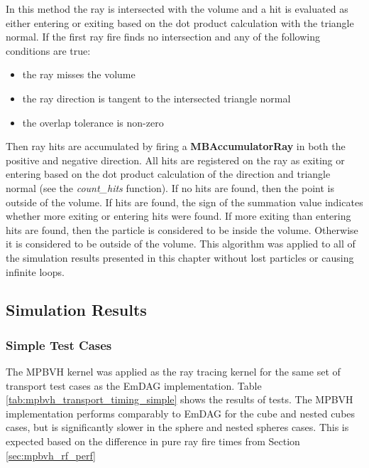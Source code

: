 In this method the ray is intersected with the volume and a hit is evaluated as
either entering or exiting based on the dot product calculation with the
triangle normal. If the first ray fire finds no intersection and any of the
following conditions are true:

\begin{itemize}
  \item the ray misses the volume
  \item the ray direction is tangent to the intersected triangle normal
  \item the overlap tolerance is non-zero
\end{itemize}

Then ray hits are accumulated by firing a \textbf{MBAccumulatorRay} in both the
positive and negative direction. All hits are registered on the ray as exiting
or entering based on the dot product calculation of the direction and triangle
normal (see the \textit{count\_hits} function). If no hits are found, then the
point is outside of the volume. If hits are found, the sign of the summation
value indicates whether more exiting or entering hits were found. If more
exiting than entering hits are found, then the particle is considered to be
inside the volume. Otherwise it is considered to be outside of the volume. This
algorithm was applied to all of the simulation results presented in this chapter
without lost particles or causing infinite loops.

\subsection{Simulation Results}

\subsubsection{Simple Test Cases}\label{subsec:mpbvh_simple_tests}
The MPBVH kernel was applied as the ray tracing kernel for the same set of
transport test cases as the EmDAG implementation. Table
\ref{tab:mpbvh_transport_timing_simple} shows the results of tests. The MPBVH
implementation performs comparably to EmDAG for the cube and nested cubes cases,
but is significantly slower in the sphere and nested spheres cases. This is
expected based on the difference in pure ray fire times from Section
\ref{sec:mpbvh_rf_perf}

